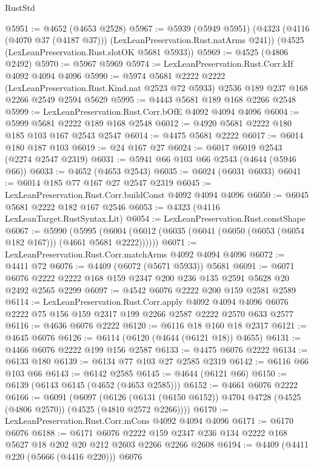\begin{lexlean}{RustStd}
\begin{coremodule}
{\begin{coremodule}
{{{{{{{{{{{{{{@5951 := @4652 (@4653 @2528)
@5967 := @5939
    (@5949 @5951)
    (@4323 (@4116 (@4070 @37 (@4187 @37))) (LexLeanPreservation.Rust.natArms @241))
    (@4525 (LexLeanPreservation.Rust.slotOK @5681 @5933))
@5969 := @4525 (@4806 @2492)
@5970 := @5967 @5969
@5974 := LexLeanPreservation.Rust.Corr.kIf @4092 @4094 @4096
@5990 := @5974
    @5681
    @2222
    @2222
    (LexLeanPreservation.Rust.Kind.nat @2523 @72 @5933)
    @2536
    @189
    @237
    @168
    @2266
    @2549
    @2594
    @5629
@5995 := @4443 @5681 @189 @168 @2266 @2548
@5999 := LexLeanPreservation.Rust.Corr.bOfE @4092 @4094 @4096
@6004 := @5999 @5681 @2222 @189 @168 @2548
@6012 := @4920 @5681 @2222 @180 @185 @103 @167 @2543 @2547
@6014 := @4475 @5681 @2222
@6017 := @6014 @180 @187 @103
@6019 := @24 @167 @27
@6024 := @6017 @6019 @2543 (@2274 @2547 @2319)
@6031 := @5941 @66 @103 @66 @2543 (@4644 (@5946 @66))
@6033 := @4652 (@4653 @2543)
@6035 := @6024 (@6031 @6033)
@6041 := @6014 @185 @77 @167 @27 @2547 @2319
@6045 := LexLeanPreservation.Rust.Corr.buildConst @4092 @4094 @4096
@6050 := @6045 @5681 @2222 @182 @167 @2546
@6053 := @4323 (@4116 LexLeanTarget.RustSyntax.Lit)
@6054 := LexLeanPreservation.Rust.constShape
@6067 := @5990
    (@5995 (@6004 (@6012 (@6035 (@6041 (@6050 (@6053 (@6054 @182 @167))) (@4661 @5681 @2222))))))
@6071 := LexLeanPreservation.Rust.Corr.matchArms @4092 @4094 @4096
@6072 := @4411 @72
@6076 := @4409 (@6072 (@5671 @5933)) @5681
@6091 := @6071 @6076 @2222 @2222 @168 @159 @2347 @200 @236 @135 @2591 @5628 @20 @2492 @2565 @2299
@6097 := @4542 @6076 @2222 @200 @159 @2581 @2589
@6114 := LexLeanPreservation.Rust.Corr.apply
    @4092
    @4094
    @4096
    @6076
    @2222
    @75
    @156
    @159
    @2317
    @199
    @2266
    @2587
    @2222
    @2570
    @633
    @2577
@6116 := @4636 @6076 @2222
@6120 := @6116 @18 @160 @18 @2317
@6121 := @4645 @6076
@6126 := @6114 (@6120 (@4644 (@6121 @18)) @4655)
@6131 := @4466 @6076 @2222 @199 @156 @2587
@6133 := @4475 @6076 @2222
@6134 := @6133 @180
@6139 := @6134 @77 @103 @27 @2585 @2319
@6142 := @6116 @66 @103 @66
@6143 := @6142 @2585
@6145 := @4644 (@6121 @66)
@6150 := @6139 (@6143 @6145 (@4652 (@4653 @2585)))
@6152 := @4661 @6076 @2222
@6166 := @6091
    (@6097
      (@6126 (@6131 (@6150 @6152)) @4704 @4728 (@4525 (@4806 @2570)) (@4525 (@4810 @2572 @2266))))
@6170 := LexLeanPreservation.Rust.Corr.mCons @4092 @4094 @4096
@6171 := @6170 @6076
@6188 := @6171
    @6076
    @2222
    @159
    @2347
    @236
    @134
    @2222
    @168
    @5627
    @18
    @202
    @20
    @212
    @2603
    @2266
    @2266
    @2608
@6194 := @4409 (@4411 @220 (@5666 (@4416 @220))) @6076
}}}}}}}}}}}}}}
\end{coremodule}}
\end{coremodule}
\end{lexlean}
